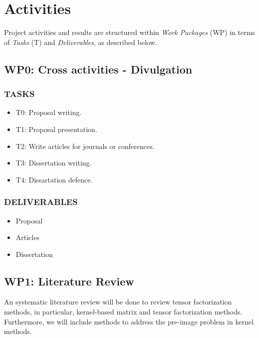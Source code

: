 \documentclass[letterpaper,12pt]{article}
\begin{document}

 
\section{Activities}

Project activities and results are structured within \textit{Work Packages} (WP) in terms of \textit{Tasks} (T) and \textit{Deliverables}, as described below.

\subsection*{WP0: Cross activities - Divulgation}
\subsubsection*{TASKS }
\begin{itemize}
\item T0: Proposal writing.
\item T1: Proposal presentation.
\item T2: Write articles for journals or conferences.
\item T3: Dissertation writing.
\item T4: Dissartation defence.
\end{itemize}
\subsubsection*{DELIVERABLES }
\begin{itemize}
 \item Proposal
 \item Articles
 \item Dissertation
\end{itemize}



\subsection*{WP1: Literature Review}
An systematic literature review will be done to review tensor factorization methods, in particular, 
kernel-based matrix and tensor factorization methods. Furthermore, we will include methods to address the pre-image problem in kernel methods.
\end{document}
